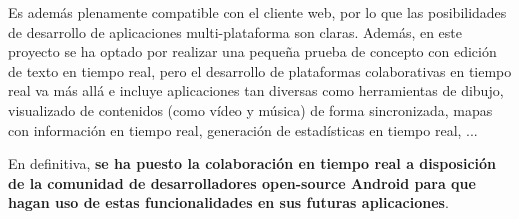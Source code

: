 Es además plenamente compatible con el cliente web, por lo que las posibilidades de desarrollo de aplicaciones multi-plataforma son claras. Además, en este proyecto se ha optado por realizar una pequeña prueba de concepto con edición de texto en tiempo real, pero el desarrollo de plataformas colaborativas en tiempo real va más allá e incluye aplicaciones tan diversas como herramientas de dibujo, visualizado de contenidos (como vídeo y música) de forma sincronizada, mapas con información en tiempo real, generación de estadísticas en tiempo real, ...

En definitiva, \textbf{se ha puesto la colaboración en tiempo real a disposición de la comunidad de desarrolladores open-source Android para que hagan uso de estas funcionalidades en sus futuras aplicaciones}.





